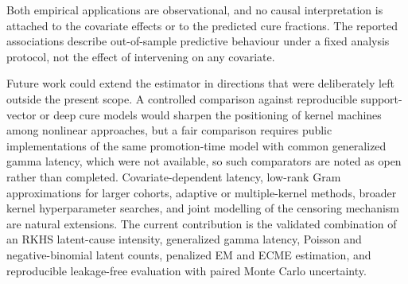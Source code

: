 Both empirical applications are observational, and no causal interpretation is attached to the covariate effects
or to the predicted cure fractions. The reported associations describe out-of-sample predictive behaviour under
a fixed analysis protocol, not the effect of intervening on any covariate.

Future work could extend the estimator in directions that were deliberately left outside the present scope.
A controlled comparison against reproducible support-vector or deep cure models would sharpen the
positioning of kernel machines among nonlinear approaches, but a fair comparison requires public
implementations of the same promotion-time model with common generalized gamma latency, which were not
available, so such comparators are noted as open rather than completed. Covariate-dependent latency,
low-rank Gram approximations for larger cohorts, adaptive or multiple-kernel methods, broader kernel
hyperparameter searches, and joint modelling of the censoring mechanism are natural extensions. The current
contribution is the validated combination of an RKHS latent-cause intensity, generalized gamma latency,
Poisson and negative-binomial latent counts, penalized EM and ECME estimation, and reproducible
leakage-free evaluation with paired Monte Carlo uncertainty.
